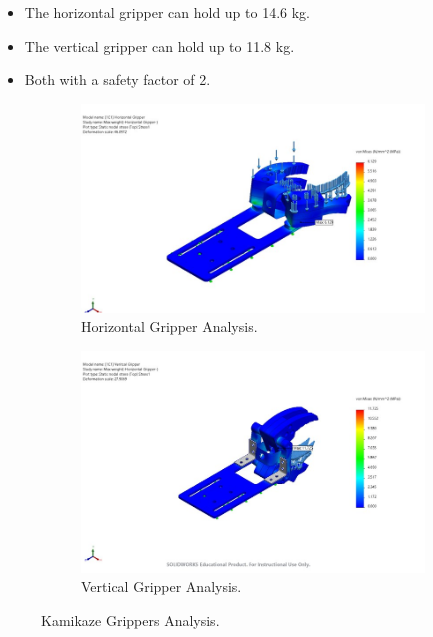 \vspace{-0.5\baselineskip}
\begin{itemize}
    \setlength{\itemsep}{0pt}
    \item The horizontal gripper can hold up to 14.6 kg.
    \item The vertical gripper can hold up to 11.8 kg.
    \item Both with a safety factor of 2.
\end{itemize}

\begin{figure}[h]
    \centering
    \begin{subfigure}[b]{0.49\columnwidth}
        \includegraphics[width=\textwidth]{Sections/2Design Rationale/images/Horizontal Max weight.jpg}
        \caption{Horizontal Gripper Analysis.}
        \label{fig:horizontal_gripper_max_weight}
    \end{subfigure}
    \hfill
    \begin{subfigure}[b]{0.49\columnwidth}
        \includegraphics[width=\textwidth]{Sections/2Design Rationale/images/Vertical max weight.jpg}
        \caption{Vertical Gripper Analysis.}
        \label{fig:vertical_gripper_max_weight}
    \end{subfigure}
    \caption{Kamikaze Grippers Analysis.}
    \label{fig:grippers_analysis}
\end{figure}
